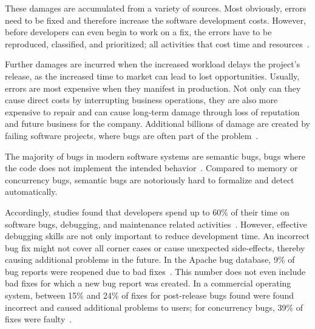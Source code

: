 These damages are accumulated from a variety of sources.
Most obviously, errors need to be fixed and therefore increase the software development costs.
However, before developers can even begin to work on a fix, the errors have to be reproduced, classified, and prioritized; all activities that cost time and resources~\cite{sahoo10:an_empirical_study, guo10:characterizing_and_predicting_which}.

Further damages are incurred when the increased workload delays the project's release, as the increased time to market can lead to lost opportunities.
Usually, errors are most expensive when they manifest in production.
Not only can they cause direct costs by interrupting business operations, they are also more expensive to repair and can cause long-term damage through loss of reputation and future business for the company.
Additional billions of damage are created by failing software projects, where bugs are often part of the problem~\cite{charette05:why_software_fails}.


\bigskip\noindent
The majority of bugs in modern software systems are semantic bugs, \ie bugs where the code does not implement the intended behavior~\cite{li06:have_things_changed_now}.
Compared to memory or concurrency bugs, semantic bugs are notoriously hard to formalize and detect automatically.

Accordingly, studies found that developers spend up to 60\% of their time on software bugs, debugging, and maintenance related activities~\cite{ballou08:improving_software_quality, hailpern02:software_debugging_testing, beizer03:software_testing_techniques}.
However, effective debugging skills are not only important to reduce development time.
An incorrect bug fix might not cover all corner cases or cause unexpected side-effects, thereby causing additional problems in the future.
In the Apache bug database, 9\% of bug reports were reopened due to bad fixes~\cite{gu10:has_the_bug_really}.
This number does not even include bad fixes for which a new bug report was created.
In a commercial operating system, between 15\% and 24\% of fixes for post-release bugs found were found incorrect and caused additional problems to users; for concurrency bugs, 39\% of fixes were faulty~\cite{yin11:how_do_fixes_become}.

